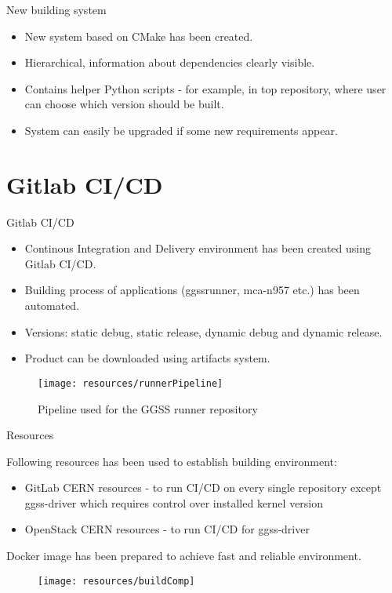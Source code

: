 \documentclass[10pt]{beamer}
\begin{document}
\begin{frame}{New building system}
\begin{itemize}
  \item New system based on CMake has been created.
  \item Hierarchical, information about dependencies clearly visible.
  \item Contains helper Python scripts - for example, in top repository, where user can choose which version should be built.
  \item System can easily be upgraded if some new requirements appear.
\end{itemize}
\end{frame}


\section {Gitlab CI/CD}

\begin{frame}{Gitlab CI/CD}
\begin{minipage}{0.65\linewidth}
\begin{itemize}
  \item Continous Integration and Delivery environment has been created using Gitlab CI/CD.
  \item Building process of applications (ggssrunner, mca-n957 etc.) has been automated. 
  \item Versions: static debug, static release, dynamic debug and dynamic release. 
  \item Product can be downloaded using artifacts system.
\end{itemize}
\end{minipage}
\begin{minipage}{0.32\linewidth}
\begin{figure}
\centering
\texttt{[image: resources/runnerPipeline]}
\caption{Pipeline used for the GGSS runner repository}
\end{figure}
\end{minipage}
\end{frame}

\begin{frame}{Resources}
\begin{minipage}{0.65\linewidth}
	Following resources has been used to establish building environment:
	\begin{itemize}
		\item GitLab CERN resources - to run CI/CD on every single repository except ggss-driver which requires control over installed kernel version
		\item OpenStack CERN resources - to run CI/CD for ggss-driver
	\end{itemize}
	Docker image has been prepared to achieve fast and reliable environment.
\end{minipage}
\begin{minipage}{0.32\linewidth}
	\begin{figure}
		\centering
		\texttt{[image: resources/buildComp]}
	\end{figure}
\end{minipage}
\end{frame}
\end{document}
